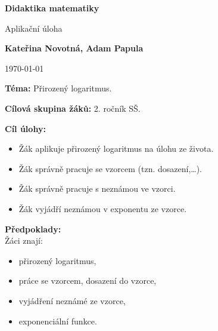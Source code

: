 \documentclass[12pt,a4paper,addpoints]{article}
\def\maintitle{Didaktika matematiky}
\def\subtitle{Aplikační úloha}
\def\authorname{Kateřina Novotná, Adam Papula}
\begin{document}
    \begin{titlepage}
        \begin{center}
            \Large\textbf{{\maintitle}}

            \normalsize
            \vspace{0.5cm}
                \subtitle
            \vspace{1.5cm}
            
            \textbf{\authorname}
            \vspace{1.5cm}

            \today
            \vfill
            
            \raggedright
                \textbf{Téma:} Přirozený logaritmus.
                
                \textbf{Cílová skupina žáků:} 2. ročník SŠ.

                \textbf{Cíl úlohy:} 
                \footnotesize
                    \vspace{-5mm}
                    \begin{itemize}
                        \item Žák aplikuje přirozený logaritmus na úlohu ze života.
                        \item Žák správně pracuje se vzorcem (tzn. dosazení,\dots).
                        \item Žák správně pracuje s neznámou ve vzorci.
                        \item Žák vyjádří neznámou v exponentu ze vzorce.
                    \end{itemize}
                \normalsize
                \textbf{Předpoklady:}\\
                \footnotesize
                Žáci znají:
                \vspace{-5mm}
                    \begin{itemize}[noitemsep,topsep=0pt]
                            \item přirozený logaritmus,
                            \item práce se vzorcem, dosazení do vzorce,
                            \item vyjádření neznámé ze vzorce,
                            \item exponenciální funkce.
                    \end{itemize}
            \normalsize
        \end{center}
    \end{titlepage}
\end{document}
